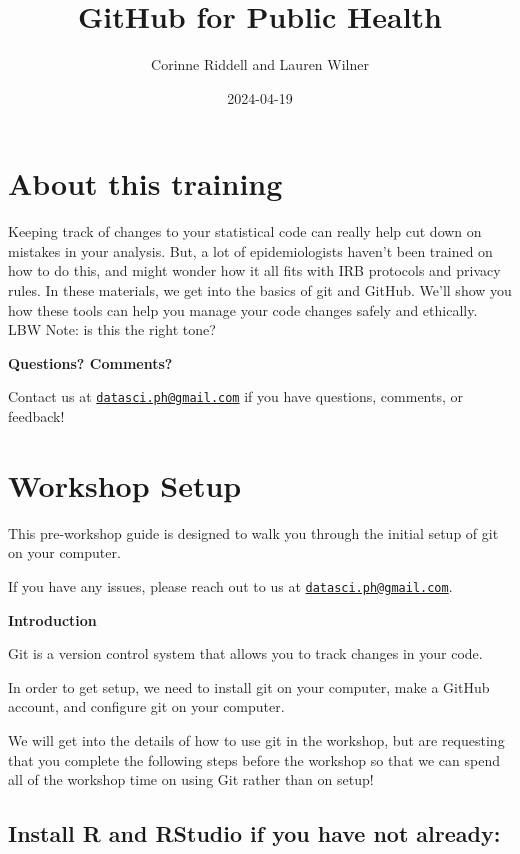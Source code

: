 \documentclass[
]{book}
\title{GitHub for Public Health}
\author{Corinne Riddell and Lauren Wilner}
\date{2024-04-19}
\begin{document}
\maketitle

{
\setcounter{tocdepth}{1}
\tableofcontents
}
\hypertarget{about-this-training}{%
\chapter{About this training}\label{about-this-training}}

Keeping track of changes to your statistical code can really help cut down on mistakes in your analysis. But, a lot of epidemiologists haven't been trained on how to do this, and might wonder how it all fits with IRB protocols and privacy rules. In these materials, we get into the basics of git and GitHub. We'll show you how these tools can help you manage your code changes safely and ethically.
LBW Note: is this the right tone?

\textbf{Questions? Comments?}

Contact us at \href{mailto:datasci.ph@gmail.com}{\nolinkurl{datasci.ph@gmail.com}} if you have questions, comments, or feedback!

\hypertarget{workshop-setup}{%
\chapter{Workshop Setup}\label{workshop-setup}}

This pre-workshop guide is designed to walk you through the initial setup of git on your computer.

If you have any issues, please reach out to us at \href{mailto:datasci.ph@gmail.com}{\nolinkurl{datasci.ph@gmail.com}}.

\textbf{Introduction}

Git is a version control system that allows you to track changes in your code.

In order to get setup, we need to install git on your computer, make a GitHub account, and configure git on your computer.

We will get into the details of how to use git in the workshop, but are requesting that you complete the following steps before the workshop so that we can spend all of the workshop time on using Git rather than on setup!

\hypertarget{install-r-and-rstudio-if-you-have-not-already}{%
\section{Install R and RStudio if you have not already:}\label{install-r-and-rstudio-if-you-have-not-already}}
\end{document}
